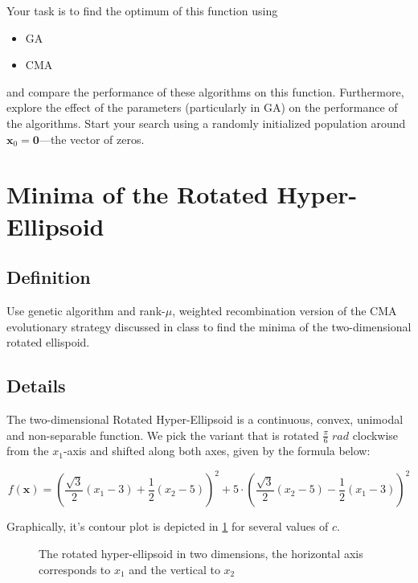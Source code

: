 \documentclass[11pt]{article}
\begin{document}
Your task is to find the optimum of this function using
\begin{itemize}
\item GA
\item CMA
\end{itemize}
and compare the performance of these algorithms on this function.
Furthermore, explore the effect of the parameters (particularly in GA) on the
performance of the algorithms. Start your search using a randomly initialized population around \(\mathbf{x}_0 = \mathbf{0}\)---the vector of zeros.
\section{Minima of the Rotated Hyper-Ellipsoid}
\label{sec:org729893e}
\subsection{Definition}
\label{sec:orgfce6c3a}
  Use genetic algorithm and rank-\(\mu\), weighted recombination version of the CMA
evolutionary strategy discussed in class to find the minima of the
two-dimensional rotated ellispoid.
\subsection{Details}
\label{sec:org29a33d2}
The two-dimensional Rotated Hyper-Ellipsoid is a continuous, convex, unimodal
and non-separable function. We pick the variant that is rotated \(\frac{\pi}{6} \; \si{rad}\) clockwise from the \(x_1\)-axis and shifted along
both axes, given by the formula below:

\begin{equation}
f(\mathbf{x}) = \left( \dfrac{\sqrt{3}}{2} (x_1 - 3) + \dfrac{1}{2} (x_2 - 5) \right)^2 + 5 \cdot \left(  \dfrac{\sqrt{3}}{2} (x_2 - 5) - \dfrac{1}{2} (x_1 - 3)  \right)^2
\end{equation}


Graphically, it's contour plot is depicted in \cref{ellipsoid} for several
  values of \(c\).
\begin{figure}[h!]
\begin{center}
\end{center}
\caption{The rotated hyper-ellipsoid in two dimensions, the horizontal axis corresponds to \( x_1 \) and the vertical to \( x_2 \)}
\label{ellipsoid}
\end{figure}
\end{document}
